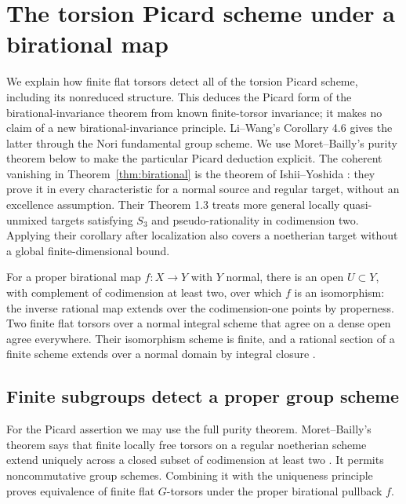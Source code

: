 \section{The torsion Picard scheme under a birational map}
We explain how finite flat torsors detect all of the torsion Picard
scheme, including its nonreduced structure. This deduces the Picard form
of the birational-invariance theorem from known finite-torsor invariance;
it makes no claim of a new birational-invariance principle.
Li--Wang's Corollary 4.6 \cite[p.~7]{LiWang} gives the latter through the
Nori fundamental group scheme. We use Moret--Bailly's purity theorem
below to make the particular Picard deduction explicit.
The coherent vanishing in
Theorem~\ref{thm:birational} is the theorem of Ishii--Yoshida
\cite[Corollary 1.4, p.~3]{IshiiYoshida}: they prove it in every
characteristic for a normal source and regular target, without an
excellence assumption. Their Theorem 1.3 treats more general locally
quasi-unmixed targets satisfying $S_3$ and pseudo-rationality in
codimension two. Applying their corollary after localization also
covers a noetherian target without a global finite-dimensional bound.

For a proper birational map $f:X\to Y$ with $Y$ normal, there is
an open $U\subset Y$, with complement of codimension at least two,
over which $f$ is an isomorphism: the inverse rational map extends
over the codimension-one points by properness. Two finite flat torsors
over a normal integral scheme that agree on a dense open agree
everywhere. Their isomorphism scheme is finite, and a rational section
of a finite scheme extends over a normal domain by integral closure
\cite[Proposition 3, p.~432]{Marrama}.

\subsection{Finite subgroups detect a proper group scheme}
For the Picard assertion we may use the full purity theorem.
Moret--Bailly's theorem says that finite locally free torsors on a
regular noetherian scheme extend uniquely across a closed subset
of codimension at least two \cite[Theorem 6]{Marrama}. It permits
noncommutative group schemes. Combining it with the uniqueness
principle proves equivalence of finite flat $G$-torsors under the
proper birational pullback $f$.

